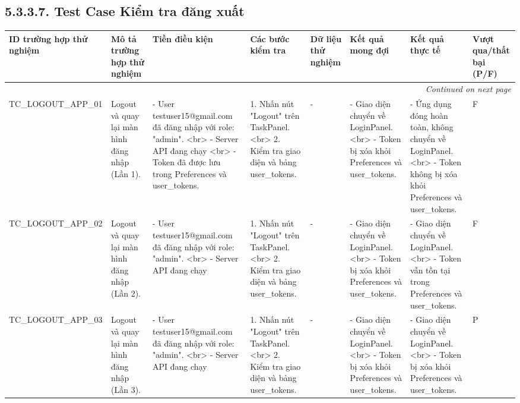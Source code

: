 \documentclass[a4paper,12pt]{article}
\begin{document}
\subsection{5.3.3.7. Test Case Kiểm tra đăng xuất}
\begin{longtable}{|p{2cm}|p{3cm}|p{3cm}|p{4cm}|p{3cm}|p{3cm}|p{3cm}|p{2cm}|}
    \hline
    \textbf{ID trường hợp thử nghiệm} & \textbf{Mô tả trường hợp thử nghiệm} & \textbf{Tiền điều kiện} & \textbf{Các bước kiểm tra} & \textbf{Dữ liệu thử nghiệm} & \textbf{Kết quả mong đợi} & \textbf{Kết quả thực tế} & \textbf{Vượt qua/thất bại (P/F)} \\ \hline
    \endhead
    \hline
    \multicolumn{8}{|r|}{\textit{Continued on next page}} \\
    \hline
    \endfoot
    \hline
    \endlastfoot
    TC_LOGOUT_APP_01 & Logout và quay lại màn hình đăng nhập (Lần 1). & - User testuser15@gmail.com đã đăng nhập với role: "admin". <br> - Server API đang chạy <br> - Token đã được lưu trong Preferences và user_tokens. & 1. Nhấn nút "Logout" trên TaskPanel. <br> 2. Kiểm tra giao diện và bảng user_tokens. & - & - Giao diện chuyển về LoginPanel. <br> - Token bị xóa khỏi Preferences và user_tokens. & - Ứng dụng đóng hoàn toàn, không chuyển về LoginPanel. <br> - Token không bị xóa khỏi Preferences và user_tokens. & F \\ \hline
    TC_LOGOUT_APP_02 & Logout và quay lại màn hình đăng nhập (Lần 2). & - User testuser15@gmail.com đã đăng nhập với role: "admin". <br> - Server API đang chạy & 1. Nhấn nút "Logout" trên TaskPanel. <br> 2. Kiểm tra giao diện và bảng user_tokens. & - & - Giao diện chuyển về LoginPanel. <br> - Token bị xóa khỏi Preferences và user_tokens. & - Giao diện chuyển về LoginPanel. <br> - Token vẫn tồn tại trong Preferences và user_tokens. & F \\ \hline
    TC_LOGOUT_APP_03 & Logout và quay lại màn hình đăng nhập (Lần 3). & - User testuser15@gmail.com đã đăng nhập với role: "admin". <br> - Server API đang chạy & 1. Nhấn nút "Logout" trên TaskPanel. <br> 2. Kiểm tra giao diện và bảng user_tokens. & - & - Giao diện chuyển về LoginPanel. <br> - Token bị xóa khỏi Preferences và user_tokens. & - Giao diện chuyển về LoginPanel. <br> - Token bị xóa khỏi Preferences và user_tokens. & P \\ \hline
\end{longtable}
\end{document}
